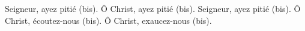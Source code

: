 Seigneur, ayez pitié (bis). Ô Christ, ayez pitié (bis). Seigneur, ayez pitié (bis). Ô Christ, écoutez-nous (bis). Ô Christ, exaucez-nous (bis).

